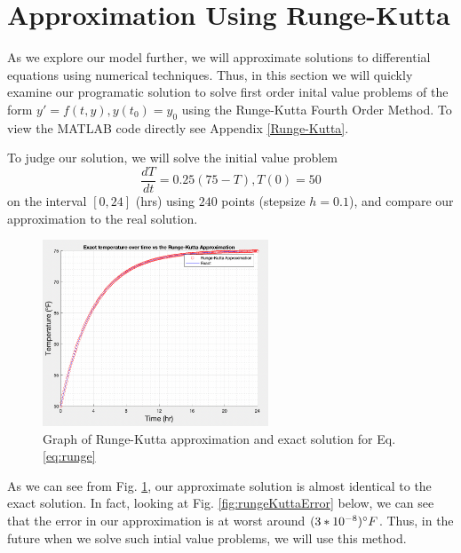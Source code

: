 \documentclass[titlepage]{article}
\begin{document}
\section{Approximation Using Runge-Kutta}
As we explore our model further, we will approximate solutions to differential equations
using numerical techniques. Thus, in this section we will quickly examine our programatic 
solution to solve first order inital value problems of the form $y'=f(t,y), y(t_0)=y_0 $ using the Runge-Kutta
Fourth Order Method. To view the MATLAB code directly see Appendix \ref{Runge-Kutta}.

To judge our solution, we will solve the initial value problem 
\begin{equation}\label{eq:runge}
    \frac{dT}{dt} = 0.25(75-T), T(0)=50
\end{equation}
on the interval $[0,24]$ (hrs) using $240$ points (stepsize $h = 0.1$), and compare our approximation to the real solution.
\begin{figure}[H]
    \centering
    \includegraphics[width=0.6\textwidth]{./images/rungeKuttaExact.png}
    \caption{Graph of Runge-Kutta approximation and exact solution for Eq. \eqref{eq:runge}}
    \label{fig:rungeKuttaExact}
\end{figure}
As we can see from Fig. \ref{fig:rungeKuttaExact}, our approximate solution is almost identical to the exact solution.
In fact, looking at Fig. \ref{fig:rungeKuttaError} below, we can see that the error in our approximation is at worst around $(3*10^{-8})\degree F$. 
Thus, in the future when we solve such intial value problems, we will use this method.
\end{document}
